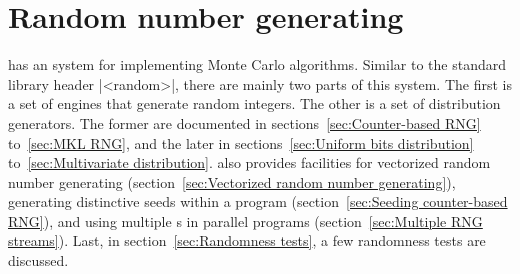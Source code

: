 %
%
%
%

\chapter{Random number generating}
\label{chap:Random number generating}

\mckl has an \rng system for implementing Monte Carlo algorithms. Similar to
the standard library header |<random>|, there are mainly two parts of this
system. The first is a set of \rng engines that generate random integers. The
other is a set of distribution generators. The former are documented in
sections~\ref{sec:Counter-based RNG} to~\ref{sec:MKL RNG}, and the later in
sections~\ref{sec:Uniform bits distribution} to~\ref{sec:Multivariate
distribution}. \mckl also provides facilities for vectorized random number
generating (section~\ref{sec:Vectorized random number generating}), generating
distinctive seeds within a program (section~\ref{sec:Seeding counter-based
RNG}), and using multiple \rng{}s in parallel programs
(section~\ref{sec:Multiple RNG streams}). Last, in section~\ref{sec:Randomness
tests}, a few randomness tests are discussed.

